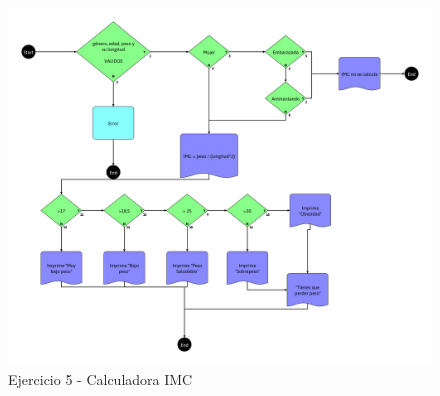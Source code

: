 \begin{figure}[htbp]
    \centering
    \includegraphics[width=0.95\columnwidth]{images/Calculadora.png}
    \caption{Ejercicio 5 - Calculadora IMC}
    \label{fig:Calculadora}
\end{figure}
